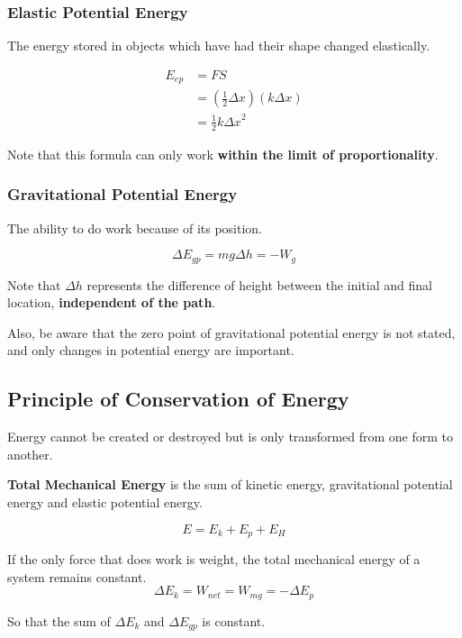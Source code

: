 \documentclass[11pt, a4paper,oneside]{book}
\begin{document}
\subsubsection{Elastic Potential Energy}
\begin{definition}
    The energy stored in objects which have had their shape changed elastically.
\end{definition}

\begin{align*}
    E_{ep} & = FS\\
    & = (\frac{1}{2}\Delta x) (k \Delta x)\\
    & = \frac{1}{2}k {\Delta x}^2 
\end{align*}

Note that this formula can only work \textbf{within the limit of proportionality}.
\subsubsection{Gravitational Potential Energy}
\begin{definition}
    The ability to do work because of its position.
\end{definition}
\[
    \Delta E_{gp} = mg\Delta h = -W_g
\]

Note that $ \Delta h $ represents the difference of height between the initial and final location, \textbf{independent of the path}.\par
Also, be aware that the zero point of gravitational potential energy is not stated, and only changes in potential energy are important.\par
\subsection{Principle of Conservation of Energy}
\begin{theorem}
    Energy cannot be created or destroyed but is only transformed from one form to another.
\end{theorem}
\begin{definition}
    \textbf{Total Mechanical Energy} is the sum of kinetic energy, gravitational potential energy and elastic potential energy.
\end{definition}
\[
    E = E_k + E_p + E_H
\]

\begin{theorem}
    If the only force that does work is weight, the total mechanical energy of a system remains constant.	
\[
    \Delta E_k = W_{net} = W_{mg} = -\Delta E_p
\]

    So that the sum of $ \Delta E_k $ and $ \Delta E_{gp} $ is constant. 
\end{theorem}
\end{document}
